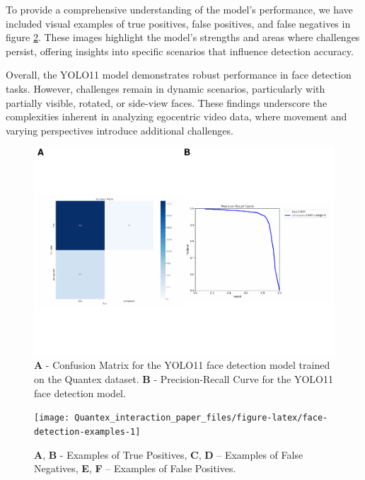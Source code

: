 \documentclass[
  man,floatsintext]{apa6}
\begin{document}
To provide a comprehensive understanding of the model's performance, we have included visual examples of true positives, false positives, and false negatives in figure \ref{fig:face-detection-examples}. These images highlight the model's strengths and areas where challenges persist, offering insights into specific scenarios that influence detection accuracy.

Overall, the YOLO11 model demonstrates robust performance in face detection tasks. However, challenges remain in dynamic scenarios, particularly with partially visible, rotated, or side-view faces. These findings underscore the complexities inherent in analyzing egocentric video data, where movement and varying perspectives introduce additional challenges.

\begin{figure}

{\centering \includegraphics{Quantex_interaction_paper_files/figure-latex/face-metrics-1} 

}

\caption{\textbf{A} - Confusion Matrix for the YOLO11 face detection model trained on the Quantex dataset. \textbf{B} - Precision-Recall Curve for the YOLO11 face detection model.}\label{fig:face-metrics}
\end{figure}

\begin{figure}

{\centering \texttt{[image: Quantex\_interaction\_paper\_files/figure-latex/face-detection-examples-1]} 

}

\caption{\textbf{A}, \textbf{B} - Examples of True Positives, \textbf{C}, \textbf{D} – Examples of False Negatives, \textbf{E}, \textbf{F} – Examples of False Positives.}\label{fig:face-detection-examples}
\end{figure}
\end{document}
